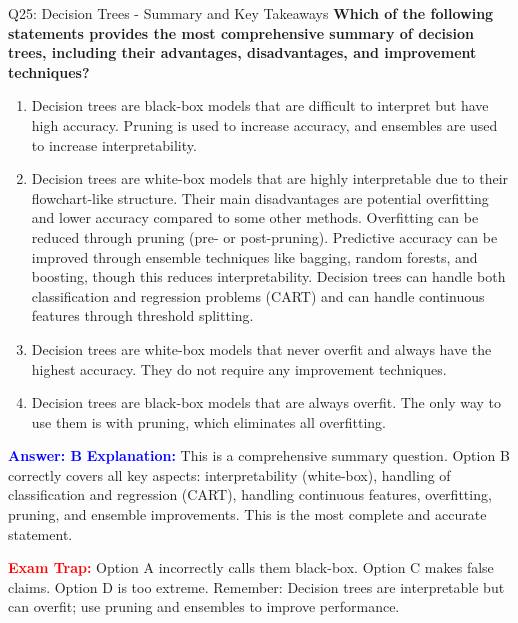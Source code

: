 \documentclass[8pt]{beamer}
\begin{document}
	\begin{frame}{Q25: Decision Trees - Summary and Key Takeaways}
		\fontsize{6.5}{7.5}\selectfont
		\textbf{Which of the following statements provides the most comprehensive summary of decision trees, including their advantages, disadvantages, and improvement techniques?}
		
		\begin{enumerate}
			\item Decision trees are black-box models that are difficult to interpret but have high accuracy. Pruning is used to increase accuracy, and ensembles are used to increase interpretability.
			\item Decision trees are white-box models that are highly interpretable due to their flowchart-like structure. Their main disadvantages are potential overfitting and lower accuracy compared to some other methods. Overfitting can be reduced through pruning (pre- or post-pruning). Predictive accuracy can be improved through ensemble techniques like bagging, random forests, and boosting, though this reduces interpretability. Decision trees can handle both classification and regression problems (CART) and can handle continuous features through threshold splitting.
			\item Decision trees are white-box models that never overfit and always have the highest accuracy. They do not require any improvement techniques.
			\item Decision trees are black-box models that are always overfit. The only way to use them is with pruning, which eliminates all overfitting.
		\end{enumerate}
		
		\vspace{0.1cm}
		\textcolor{blue}{\textbf{Answer: B}}
		\vspace{0.1cm}
		\textcolor{blue}{\textbf{Explanation:}} This is a comprehensive summary question. Option B correctly covers all key aspects: interpretability (white-box), handling of classification and regression (CART), handling continuous features, overfitting, pruning, and ensemble improvements. This is the most complete and accurate statement.
		
		\textcolor{red}{\textbf{Exam Trap:}} Option A incorrectly calls them black-box. Option C makes false claims. Option D is too extreme. Remember: Decision trees are interpretable but can overfit; use pruning and ensembles to improve performance.
	\end{frame}
	
\end{document}
